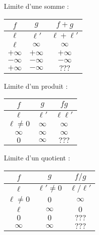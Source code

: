 \documentclass{cornouaille}
\begin{document}
\enlargethispage{5mm}

\begin{propriete}
\begin{colitemize}{3}
\item Limite d'une somme :\par
\begin{tabular}{@{}|c|c|c|}
\hline
\rowcolor{white} $f$ & $g$ & $f+g$ \\
\hline
$\ell$ & $\ell'$ & $\ell+\ell'$ \\
\hline
$\ell$ & $\infty$ &  $\infty$ \\
\hline
$+\infty$ & $+\infty$  & $+\infty$  \\
\hline
$-\infty$ & $-\infty$  & $-\infty$  \\
\hline
 \rowcolor{Noir!10}  $+\infty$ &  $-\infty$ &  $???$ \\
 \hline
 \end{tabular}
\item Limite d'un produit :\par
\begin{tabular}{@{}|c|c|c|}
\hline
\rowcolor{white} $f$ & $g$ & $fg$ \\
\hline
$\ell$ & $\ell'$ & $\ell\ell'$ \\
\hline
$\ell\!\neq\!0$ & $\infty$ &  $\infty$ \\
\hline
$\infty$ & $\infty$  & $\infty$  \\
\hline
 \rowcolor{Noir!10}  $0$ &  $\infty$ &  $???$ \\
 \hline
 \end{tabular}
 \item Limite d'un quotient :\par
\begin{tabular}{@{}|c|c|c|}
\hline
\rowcolor{white} $f$ & $g$ & $f/g$ \\
\hline
$\ell$ & $\ell'\!\neq\!0$ & $\ell/\ell'$ \\
\hline
$\ell\!\neq\!0$ & $0$ &  $\infty$ \\
\hline
$\ell$ & $\infty$  & $0$  \\
\hline
\rowcolor{Noir!10}   $0$ & $0$  & $???$  \\
\hline
 \rowcolor{Noir!10}  $\infty$ &  $\infty$ &  $???$ \\
 \hline
 \end{tabular}
\end{colitemize}
\end{propriete}
\end{document}
